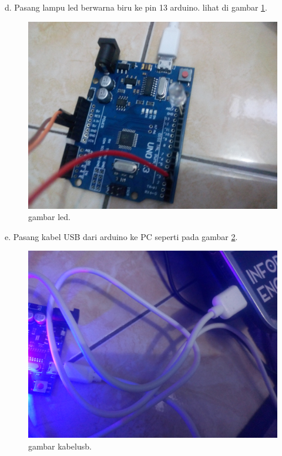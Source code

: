 d. Pasang lampu led berwarna biru ke pin 13 arduino. lihat di gambar \ref{ckled}.

\begin{figure} [ht]
\centerline{\includegraphics[width=1\textwidth]{figures/led.JPG}}
\caption{gambar led.}
\label{ckled}
\end{figure}

e. Pasang kabel USB dari arduino ke PC seperti pada gambar \ref{ckkabelusb}.

\begin{figure} [ht]
\centerline{\includegraphics[width=1\textwidth]{figures/kabelusb.JPG}}
\caption{gambar kabelusb.}
\label{ckkabelusb}
\end{figure}

